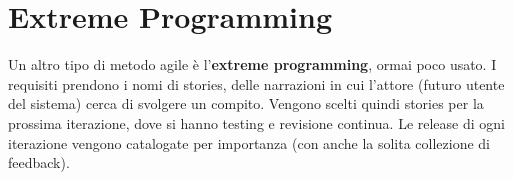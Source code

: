 \section{Extreme Programming}
Un altro tipo di metodo agile è l'\textbf{extreme programming}, ormai poco usato. I requisiti prendono i nomi di stories, delle narrazioni in cui l’attore (futuro utente del sistema) cerca di svolgere un compito. Vengono scelti quindi stories per la prossima iterazione, dove si hanno testing e revisione continua. Le release di ogni iterazione vengono catalogate per importanza (con anche la solita collezione di feedback).